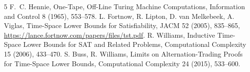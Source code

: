 \documentclass[11pt]{article}
\begin{document}
\begin{thebibliography}{5}
 F.~C. Hennie, One-Tape, Off-Line Turing Machine Computations, Information and Control 8 (1965), 553--578.
 L. Fortnow, R. Lipton, D. van Melkebeek, A. Viglas, Time-Space Lower Bounds for Satisfiability, JACM 52 (2005), 835--865, \url{https://lance.fortnow.com/papers/files/tst.pdf}.
 R. Williams, Inductive Time-Space Lower Bounds for SAT and Related Problems, Computational Complexity 15 (2006), 433--470.
 S. Buss, R. Williams, Limits on Alternation-Trading Proofs for Time-Space Lower Bounds, Computational Complexity 24 (2015), 533--600.
\end{thebibliography}
\end{document}
